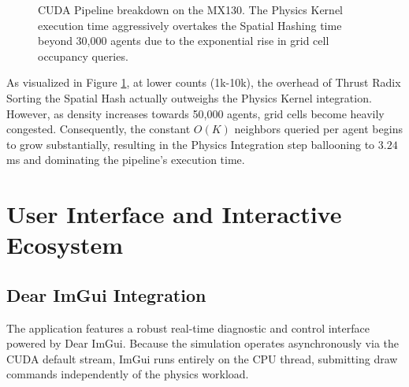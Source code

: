 \documentclass[12pt,a4paper]{report}
\begin{document}
\begin{figure}[H]
    \centering
    \caption{CUDA Pipeline breakdown on the MX130. The Physics Kernel execution time aggressively overtakes the Spatial Hashing time beyond 30,000 agents due to the exponential rise in grid cell occupancy queries.}
    \label{fig:profiling_graph}
\end{figure}

As visualized in Figure \ref{fig:profiling_graph}, at lower counts (1k-10k), the overhead of Thrust Radix Sorting the Spatial Hash actually outweighs the Physics Kernel integration. However, as density increases towards 50,000 agents, grid cells become heavily congested. Consequently, the constant $O(K)$ neighbors queried per agent begins to grow substantially, resulting in the Physics Integration step ballooning to $3.24$ ms and dominating the pipeline's execution time.

\chapter{User Interface and Interactive Ecosystem}

\section{Dear ImGui Integration}
The application features a robust real-time diagnostic and control interface powered by Dear ImGui. Because the simulation operates asynchronously via the CUDA default stream, ImGui runs entirely on the CPU thread, submitting draw commands independently of the physics workload. 
\end{document}
